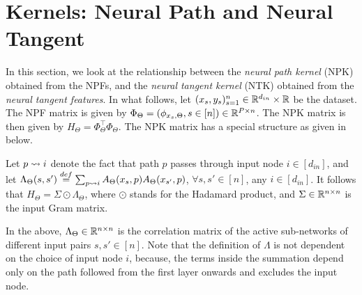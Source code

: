 \section{Kernels: Neural Path and Neural Tangent}\label{sec:kernels}
In this section, we look at the relationship between the \emph{neural path kernel} (NPK) obtained from the NPFs, and the \emph{neural tangent kernel} (NTK) obtained from the \emph{neural tangent features}. In what follows, let $(x_s,y_s)_{s=1}^n\in\mathbb{R}^{d_{in}}\times\mathbb{R}$ be the dataset. \\
The NPF matrix is given by $\Phi_{\Theta}=(\phi_{x_s,\Theta},s\in[n])\in\mathbb{R}^{P\times n}$. The NPK matrix is then given by $H_{\Theta}=\Phi^\top_{\Theta}\Phi_{\Theta}$. The NPK matrix has a special structure as given in  below.
\begin{lemma}\label{lm:npk}
Let $p\rightsquigarrow i$ denote the fact that path $p$ passes through input node $i\in[d_{in}]$, and let $\Lambda_{\Theta}(s,s')\stackrel{def}{=}\sum_{p\rightsquigarrow i} A_{\Theta}(x_s,p) A_{\Theta}(x_{s'},p)$, $\forall s,s'\in[n]$, any $i\in [d_{in}]$. It follows that $H_{\Theta}= \Sigma\odot\Lambda_{\Theta}$, where $\odot$ stands for the Hadamard product, and $\Sigma \in \mathbb{R}^{n\times n}$ is the input Gram matrix.
\end{lemma}
In the  above, $\Lambda_{\Theta}\in\mathbb{R}^{n\times n}$ is the correlation matrix of the active sub-networks of different input pairs $s,s'\in[n]$. Note that the definition of $\Lambda$ is not dependent on the choice of input node $i$, because, the terms inside the summation depend only on the path followed from the first layer onwards and excludes the input node.

